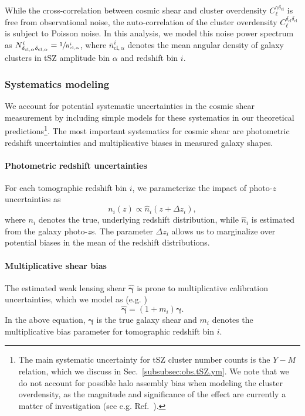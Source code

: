 \documentclass[%
 reprint,
nofootinbib,
 amsmath,amssymb,
 aps,
]{revtex4-1}
\begin{document}
While the cross-correlation between cosmic shear and cluster overdensity $C_{\ell}^{\gamma \delta_{\mathrm{cl}}}$ is free from observational noise, the auto-correlation of the cluster overdensity $C_{\ell}^{\delta_{\mathrm{cl}}\delta_{\mathrm{cl}}}$ is subject to Poisson noise. In this analysis, we model this noise power spectrum as $N^{i}_{\delta_{\mathrm{cl}, \alpha} \delta_{\mathrm{cl}, \alpha}} = \sfrac{1}{\bar{n}^{i}_{\mathrm{cl}, \alpha}}$, where $\bar{n}^{i}_{\mathrm{cl}, \alpha}$ denotes the mean angular density of galaxy clusters in tSZ amplitude bin $\alpha$ and redshift bin $i$.

\subsubsection{Systematics modeling}\label{subsec:obs.ps.syst}

We account for potential systematic uncertainties in the cosmic shear measurement by including simple models for these systematics in our theoretical predictions\footnote{The main systematic uncertainty for tSZ cluster number counts is the $Y-M$ relation, which we discuss in Sec.~\ref{subsubsec:obs.tSZ.ym}. We note that we do not account for possible halo assembly bias when modeling the cluster overdensity, as the magnitude and significance of the effect are currently a matter of investigation (see e.g. Ref.~\cite{Sunayama:2019}).}. The most important systematics for cosmic shear are photometric redshift uncertainties and multiplicative biases in measured galaxy shapes. 

\paragraph{Photometric redshift uncertainties}
For each tomographic redshift bin $i$, we parameterize the impact of photo-$z$ uncertainties as
\begin{equation}
n_{i}(z) \propto \hat{n}_{i}(z + \Delta z_{i}),
\end{equation}
where $n_{i}$ denotes the true, underlying redshift distribution, while $\hat{n}_{i}$ is estimated from the galaxy photo-$z$s. The parameter $\Delta z_{i}$ allows us to marginalize over potential biases in the mean of the redshift distributions. 

\paragraph{Multiplicative shear bias}
The estimated weak lensing shear $\boldsymbol{\hat{\gamma}}$ is prone to multiplicative calibration uncertainties, which we model as (e.g. \cite{Heymans:2006})
\begin{equation}
\boldsymbol{\hat{\gamma}} = (1 + m_{i}) \boldsymbol{\gamma}.
\end{equation}
In the above equation, $\boldsymbol{\gamma}$ is the true galaxy shear and $m_{i}$ denotes the multiplicative bias parameter for tomographic redshift bin $i$. 
\end{document}
